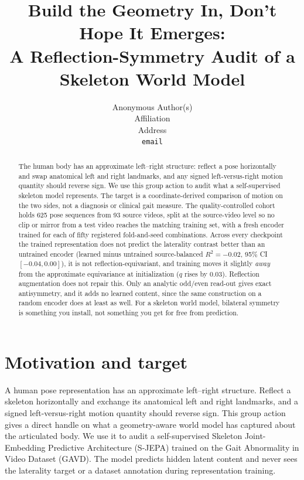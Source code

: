 \documentclass{article}
\title{Build the Geometry In, Don't Hope It Emerges:\\ A Reflection-Symmetry Audit of a Skeleton World Model}
\author{%
  Anonymous Author(s)\\
  Affiliation\\
  Address\\
  \texttt{email}\\
}
\begin{document}
\maketitle

\begin{abstract}
The human body has an approximate left--right structure: reflect a pose horizontally and swap anatomical left and right landmarks, and any signed left-versus-right motion quantity should reverse sign. We use this group action to audit what a self-supervised skeleton model represents. The target is a coordinate-derived comparison of motion on the two sides, not a diagnosis or clinical gait measure. The quality-controlled cohort holds 625 pose sequences from 93 source videos, split at the source-video level so no clip or mirror from a test video reaches the matching training set, with a fresh encoder trained for each of fifty registered fold-and-seed combinations. Across every checkpoint the trained representation does not predict the laterality contrast better than an untrained encoder (learned minus untrained source-balanced $R^2 = -0.02$, 95\% CI $[-0.04, 0.00]$), it is not reflection-equivariant, and training moves it slightly \emph{away} from the approximate equivariance at initialization ($q$ rises by $0.03$). Reflection augmentation does not repair this. Only an analytic odd/even read-out gives exact antisymmetry, and it adds no learned content, since the same construction on a random encoder does at least as well. For a skeleton world model, bilateral symmetry is something you install, not something you get for free from prediction.
\end{abstract}

\section{Motivation and target}

A human pose representation has an approximate left--right structure. Reflect a skeleton horizontally and exchange its anatomical left and right landmarks, and a signed left-versus-right motion quantity should reverse sign. This group action gives a direct handle on what a geometry-aware world model has captured about the articulated body. We use it to audit a self-supervised Skeleton Joint-Embedding Predictive Architecture (S-JEPA) trained on the Gait Abnormality in Video Dataset (GAVD). The model predicts hidden latent content and never sees the laterality target or a dataset annotation during representation training.
\end{document}
